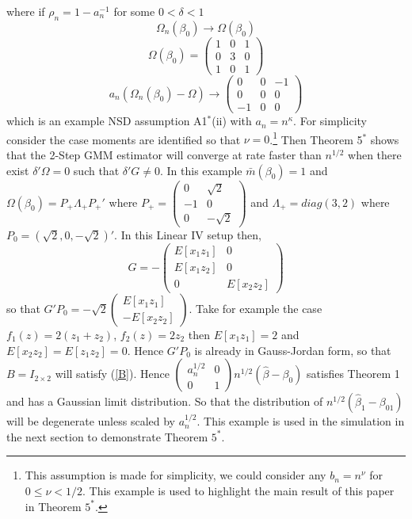 \documentclass[11pt, fleqn]{article}
\begin{document}
where if $\rho_n =1-a_n^{-1}$ for some $0<\delta<1$ 
\begin{equation}\Omega_n(\beta_0)\rightarrow \Omega(\beta_0) \end{equation}
\begin{equation} \Omega(\beta_0)=\left(\begin{array}{ccc} 1 & 0& 1 \\ 0 & 3& 0\\ 1& 0 & 1\end{array}\right) \end{equation}
\begin{equation}a_n(\Omega_n(\beta_0)-\Omega)\rightarrow 
\left(\begin{array}{ccc} 0 & 0& -1 \\ 0 & 0& 0\\ -1& 0 & 0\end{array}\right) \end{equation}
which is an example  NSD assumption A1$^*$(ii)  with $a_n=n^{\kappa}$.  
For simplicity consider the case moments are identified so that $\nu=0$.\footnote{This assumption is made for simplicity, we could consider any $b_n=n^{\nu}$ for $0 \leq \nu<1/2$. This example is used to highlight the main result of this paper in Theorem $5^*$.}
Then  Theorem 5$^*$ shows that the  
2-Step GMM estimator  will converge at rate faster than $n^{1/2}$ when there exist $\delta'\Omega=0$ such that $\delta'G\neq 0$. In this example $\bar{m}(\beta_0)=1$ and  $\Omega(\beta_0)=P_+\Lambda_+P_+'$ where $P_+=\left(\begin{array}{cc} 0 & \sqrt{2} \\ -1 & 0 \\ 0 & -\sqrt{2} \end{array}\right)$ and $\Lambda_+=diag(3,2)$ where $P_0=(\sqrt{2},0, -\sqrt{2})'$. In this Linear IV setup then,
\begin{equation} G=-\left(\begin{array}{cc} E[x_1z_1] & 0\\  E[x_1 z_2] & 0\\ 0 & E[x_2z_2]\end{array} \right) \end{equation}
so that $G'P_0=-\sqrt{2}\left(\begin{array}{c} E[x_1z_1] \\ -E[x_2 z_2]\end{array}\right)$.
Take for example the case  $f_1(z)=2(z_1+z_2)$, $f_2(z)=2z_2$ then $E[x_1z_1]=2$ and $E[x_2z_2]=E[z_1z_2]=0$.  Hence $G'P_0$ is already in Gauss-Jordan form, so that $B=I_{2\times 2}$ will satisfy (\ref{B}). Hence $\left(\begin{array}{cc}a_n^{1/2}& 0 \\ 0 & 1 \end{array}\right)n^{1/2}(\hat{\beta}-\beta_0)$ satisfies Theorem 1 and has a Gaussian limit distribution. So that the distribution of $n^{1/2}(\hat{\beta}_1-\beta_{01})$ will be degenerate unless scaled by $a_n^{1/2}$. This example is used in the simulation in the next section to demonstrate Theorem $5^*$.
\end{document}

